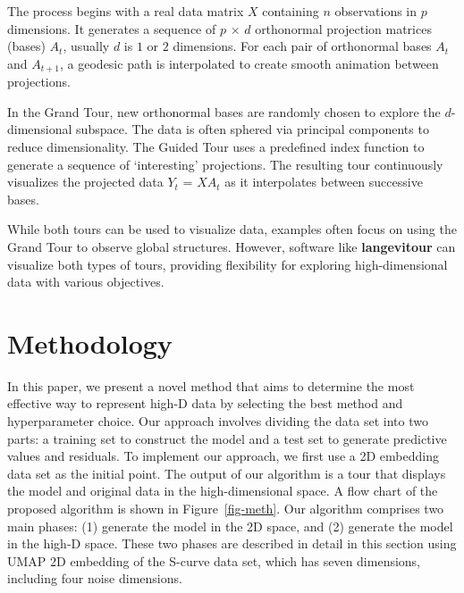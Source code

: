 \documentclass[
  12pt]{article}
\begin{document}
The process begins with a real data matrix \(X\) containing \(n\)
observations in \(p\) dimensions. It generates a sequence of \(p\) ×
\(d\) orthonormal projection matrices (bases) \(A_t\), usually \(d\) is
\(1\) or \(2\) dimensions. For each pair of orthonormal bases \(A_t\)
and \(A_{t+1}\), a geodesic path is interpolated to create smooth
animation between projections.

In the Grand Tour, new orthonormal bases are randomly chosen to explore
the \(d\)-dimensional subspace. The data is often sphered via principal
components to reduce dimensionality. The Guided Tour uses a predefined
index function to generate a sequence of `interesting' projections. The
resulting tour continuously visualizes the projected data \(Y_t\) =
\(XA_t\) as it interpolates between successive bases.

While both tours can be used to visualize data, examples often focus on
using the Grand Tour to observe global structures. However, software
like \textbf{langevitour} can visualize both types of tours, providing
flexibility for exploring high-dimensional data with various objectives.

\hypertarget{sec-methods}{%
\section{Methodology}\label{sec-methods}}

In this paper, we present a novel method that aims to determine the most
effective way to represent high-D data by selecting the best method and
hyperparameter choice. Our approach involves dividing the data set into
two parts: a training set to construct the model and a test set to
generate predictive values and residuals. To implement our approach, we
first use a 2D embedding data set as the initial point. The output of
our algorithm is a tour that displays the model and original data in the
high-dimensional space. A flow chart of the proposed algorithm is shown
in Figure~\ref{fig-meth}. Our algorithm comprises two main phases: (1)
generate the model in the 2D space, and (2) generate the model in the
high-D space. These two phases are described in detail in this section
using UMAP 2D embedding of the S-curve data set, which has seven
dimensions, including four noise dimensions.
\end{document}
